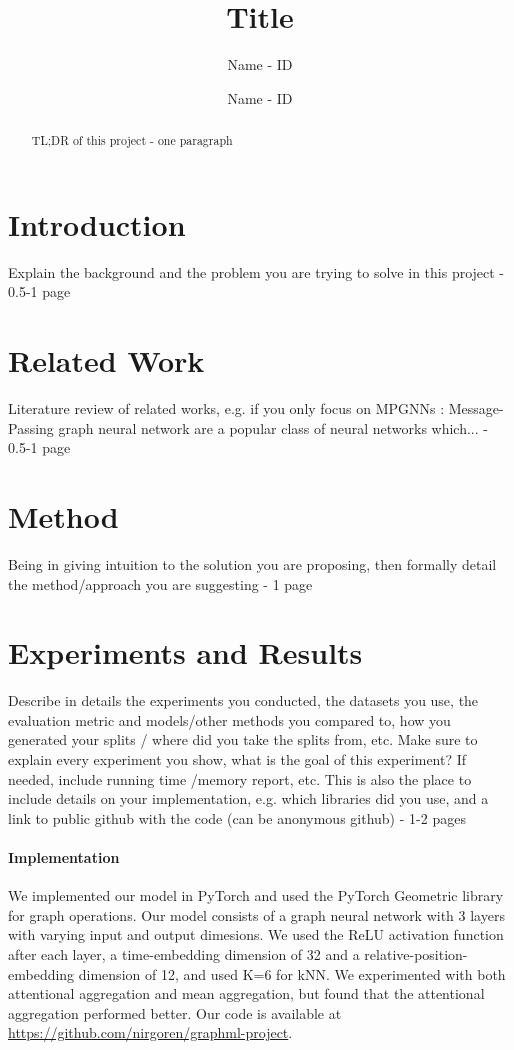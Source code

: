 \documentclass{acmart}
\title{Title}
\author{Name - ID}
\author{Name - ID}
\date{}
\begin{document}
\begin{abstract}
TL;DR of this project -  one paragraph
\end{abstract}
\maketitle

\section{Introduction}
 Explain the background and the problem you are trying to solve in this project - 0.5-1 page
\section{Related Work}
Literature review of related works, e.g. if you only focus on MPGNNs : Message-Passing graph neural network are a popular class of neural networks which...\cite{morris2021weisfeiler} - 0.5-1 page


\section{Method}
Being in giving intuition to the solution you are proposing, then formally detail the method/approach you are suggesting -  1 page



\section{Experiments and Results}
 Describe in details the experiments you conducted, the datasets you use, the evaluation metric and models/other methods you compared to, how you generated your splits / where did you take the splits from, etc. Make sure to explain every experiment you show, what is the goal of this experiment? If needed, include running time /memory report, etc.
This is also the place to include details on your implementation, e.g. which libraries did you use, and a link to public github with the code (can be anonymous github) - 1-2 pages

\paragraph{Implementation}
We implemented our model in PyTorch and used the PyTorch Geometric library for graph operations. Our model consists of a graph neural network with 3 layers with varying input and output dimesions. We used the ReLU activation function after each layer, a time-embedding dimension of 32 and a relative-position-embedding dimension of 12, and used K=6 for kNN. We experimented with both attentional aggregation and mean aggregation, but found that the attentional aggregation performed better. Our code is available at \url{https://github.com/nirgoren/graphml-project}.
\end{document}

